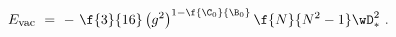 \begin{equation}\label{e1tris}
E_{\mbox{\footnotesize{\textrm{vac}}}} ~=~ -~ \f{3}{16}\left(g^{2}
\right)^{1-\f{\C_{0}} {\B_{0}}}\f{N}{N^{2}-1}\wD_{*}^{2} ~.
\end{equation}

